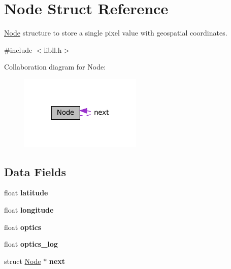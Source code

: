\hypertarget{structNode}{\section{Node Struct Reference}
\label{structNode}
}


\hyperlink{structNode}{Node} structure to store a single pixel value with geospatial coordinates.  




{\ttfamily \#include $<$libll.\-h$>$}



Collaboration diagram for Node\-:\nopagebreak
\begin{figure}[H]
\begin{center}
\leavevmode
\includegraphics[width=165pt]{structNode__coll__graph}
\end{center}
\end{figure}
\subsection*{Data Fields}
\begin{DoxyCompactItemize}
\item 
\hypertarget{structNode_aef330e086c52cb0a14484b704a21f6c2}{float {\bfseries latitude}}\label{structNode_aef330e086c52cb0a14484b704a21f6c2}

\item 
\hypertarget{structNode_a6277484affb80e92218f52f5a38b8c09}{float {\bfseries longitude}}\label{structNode_a6277484affb80e92218f52f5a38b8c09}

\item 
\hypertarget{structNode_a4c704dbdd845bd145f41f9adaf485510}{float {\bfseries optics}}\label{structNode_a4c704dbdd845bd145f41f9adaf485510}

\item 
\hypertarget{structNode_a68d6e2a9d30f2f1280687f602411d545}{float {\bfseries optics\-\_\-log}}\label{structNode_a68d6e2a9d30f2f1280687f602411d545}

\item 
\hypertarget{structNode_af67b110ca1a258b793bf69d306929b22}{struct \hyperlink{structNode}{Node} $\ast$ {\bfseries next}}\label{structNode_af67b110ca1a258b793bf69d306929b22}

\end{DoxyCompactItemize}


